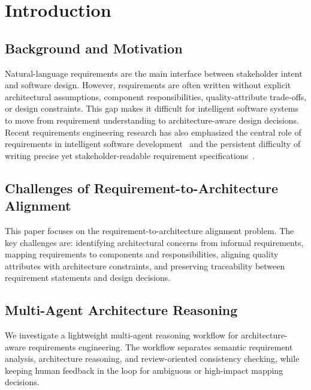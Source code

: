 \section{Introduction}
\label{introduction}

\subsection{Background and Motivation}
\label{sec:intro-background}

Natural-language requirements are the main interface between stakeholder intent and software design.
However, requirements are often written without explicit architectural assumptions, component responsibilities, quality-attribute trade-offs, or design constraints.
This gap makes it difficult for intelligent software systems to move from requirement understanding to architecture-aware design decisions.
Recent requirements engineering research has also emphasized the central role of requirements in intelligent software development~\cite{robinsonRequirementsAreAll2025} and the persistent difficulty of writing precise yet stakeholder-readable requirement specifications~\cite{darifControlledNaturalLanguage2026}.

\subsection{Challenges of Requirement-to-Architecture Alignment}
\label{sec:intro-challenges}

This paper focuses on the requirement-to-architecture alignment problem.
The key challenges are: identifying architectural concerns from informal requirements, mapping requirements to components and responsibilities, aligning quality attributes with architecture constraints, and preserving traceability between requirement statements and design decisions.

\subsection{Multi-Agent Architecture Reasoning}
\label{sec:intro-multi-agent}

We investigate a lightweight multi-agent reasoning workflow for architecture-aware requirements engineering.
The workflow separates semantic requirement analysis, architecture reasoning, and review-oriented consistency checking, while keeping human feedback in the loop for ambiguous or high-impact mapping decisions.

